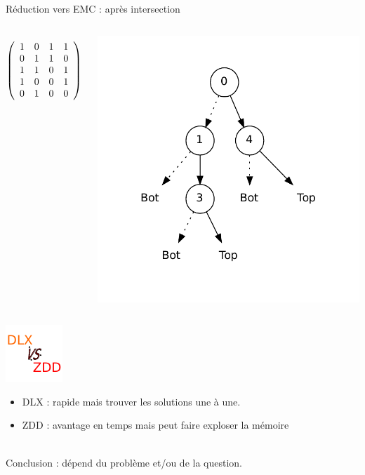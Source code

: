\documentclass{beamer}
\begin{document}
\begin{frame}{Réduction vers EMC : après intersection}
  \begin{columns}

  \begin{displaymath}
   \left(\begin{array}{ c c c c c }
   1 & 0 & 1 & 1 \\
   0 & 1 & 1 & 0 \\
   1 & 1 & 0 & 1 \\
   1 & 0 & 0 & 1 \\
   0 & 1 & 0 & 0
  \end{array}\right)
  \end{displaymath}

    \includegraphics[height=0.8\textheight]{../imports/inter.pdf}
  \end{columns}
\end{frame}

\begin{frame}{}
\begin{center}
    \includegraphics[height=0.5\textheight]{../imports/vs.pdf}
\end{center}
\begin{itemize}
\item DLX : rapide mais trouver les solutions une à une.
\item ZDD : avantage en temps mais peut faire exploser la mémoire \\
\end{itemize}
~\\
Conclusion : dépend du problème et/ou de la question.
\end{frame}
\end{document}
